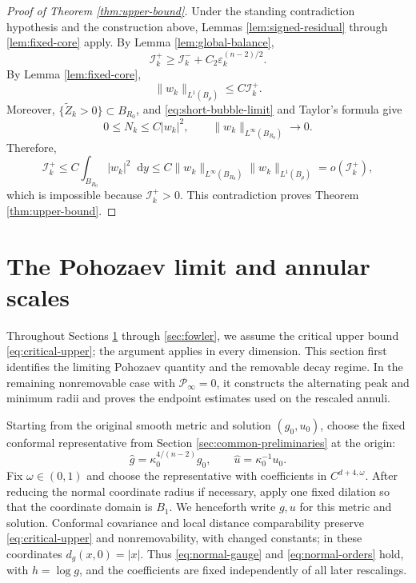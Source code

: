 \documentclass[11pt]{article}
\numberwithin{equation}{section}
\theoremstyle{remark}
\newcommand{\cP}{\mathcal P}
\newcommand{\dd}{\mathop{}\!\mathrm{d}}
\begin{document}
 \begin{proof}[Proof of Theorem  \ref{thm:upper-bound}]
{Under the standing contradiction hypothesis and the construction above,
Lemmas  \ref{lem:signed-residual}  through  \ref{lem:fixed-core} apply. By
Lemma  \ref{lem:global-balance},}
{
\[
 \mathcal I_k^+\ge \mathcal I_k^-+C_2\varepsilon_k^{(n-2)/2}.
\]
}
 By Lemma  \ref{lem:fixed-core},
{
\[
 \|w_k\|_{L^1(B_\rho)}\le C\mathcal I_k^+.
\]
}
 Moreover, $\{\widetilde Z_k>0\}\subset B_{R_0}$, and
\eqref{eq:short-bubble-limit} and Taylor's formula  give
{
\[
 0\le N_k\le C|w_k|^2,
 \qquad
 \|w_k\|_{L^\infty(B_{R_0})}\to0.
\]
}
 Therefore,
{
\[
 \mathcal I_k^+
 \le C\int_{B_{R_0}}|w_k|^2\dd y
 \le C\|w_k\|_{L^\infty(B_{R_0})}
             \|w_k\|_{L^1(B_\rho)}
 =o(\mathcal I_k^+),
\]
}
 {which is impossible because \(\mathcal I_k^+>0\).  This contradiction
proves Theorem  \ref{thm:upper-bound}.}
\end{proof}
\section{The Pohozaev limit and annular scales}
\label{sec:pohozaev-dichotomy}

{
Throughout Sections  \ref{sec:pohozaev-dichotomy}  through  \ref{sec:fowler}, we
assume the critical upper bound \eqref{eq:critical-upper}; the argument
applies in every dimension.  This section first identifies the
limiting Pohozaev quantity and the removable decay regime.  In the remaining
nonremovable case with \(\cP_\infty=0\), it constructs the alternating peak
and minimum radii and proves the endpoint estimates used on the rescaled
annuli.
}

Starting from the original smooth metric and solution \((g_0,u_0)\),
choose the fixed conformal representative from
Section  \ref{sec:common-preliminaries} at the origin:
\[
 \widehat g=\kappa_0^{4/(n-2)}g_0,
 \qquad \widehat u=\kappa_0^{-1}u_0.
\]
Fix \(\omega\in(0,1)\) and choose the representative with coefficients
in \(C^{d+4,\omega}\). After reducing the normal coordinate
radius if necessary, apply one fixed dilation so that the coordinate domain
is \(B_1\). We henceforth write
\(g,u\) for this metric and solution. Conformal covariance and local
distance comparability preserve \eqref{eq:critical-upper} and
nonremovability, with changed constants; in these coordinates
\(d_g(x,0)=|x|\). Thus \eqref{eq:normal-gauge} and
\eqref{eq:normal-orders} hold, with \(h=\log g\), and the coefficients
are fixed independently of all later rescalings.
\end{document}
